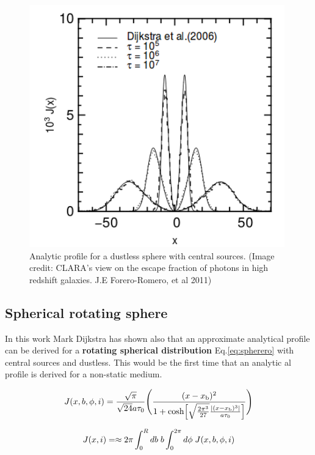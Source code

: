 \begin{figure}[H]
\begin{center}
\includegraphics[scale=0.4]{../Figures/Sphere.png}
\end{center}\caption{Analytic profile for a dustless sphere with central \ly sources.  (Image credit: CLARA's view on the escape fraction of \ly photons in high redshift galaxies. J.E Forero-Romero, et al 2011)\label{fig:sphere}}
\end{figure}

\subsection{Spherical rotating sphere}

In this work Mark Dijkstra has shown also that an approximate analytical profile
can be derived for a {\bf{rotating spherical distribution}} Eq.\ref{eq:spherero}
with central sources and dustless. This would be the first time that an analytic
al profile is derived for a non-static medium.  

\begin{equation}\label{eq:spherero}
J(x,b,\phi,i)=\frac{\sqrt{\pi}}{\sqrt{24}a\tau_0}\Bigg{(}\frac{(x-x_{\rm
b})^2}{1+{\rm cosh}\Big{[}\sqrt{\frac{2\pi^3}{27}}\frac{|(x
-x_{\rm b})^3|}{a\tau_0}\Big{]}}\Bigg{)}
\end{equation}

\begin{equation}
J(x,i)= \approx 2\pi \int_0^Rdb {\hspace{1mm}} b
\int_0^{2\pi}d\phi {\hspace{1mm}} J(x,b,\phi,i)\\ \nonumber
\end{equation}

